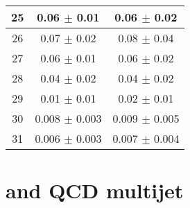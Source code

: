 \begin{table}[!htbp]
\begin{tabular}{c|c|c}
25 & 0.06  $\pm$  0.01  & 0.06 $\pm$ 0.02    \\\hline
26 & 0.07  $\pm$  0.02  & 0.08 $\pm$ 0.04    \\\hline
27 & 0.06  $\pm$  0.01  & 0.06 $\pm$ 0.02    \\\hline
28 & 0.04  $\pm$  0.02  & 0.04 $\pm$ 0.02    \\\hline
29 & 0.01  $\pm$  0.01  & 0.02 $\pm$ 0.01    \\\hline
30 & 0.008  $\pm$  0.003  & 0.009 $\pm$ 0.005    \\\hline
31 & 0.006  $\pm$  0.003  & 0.007 $\pm$ 0.004    \\\hline
\end{tabular}
\end{table}
\onecolumn
\clearpage
\section{\gjets and QCD multijet}
